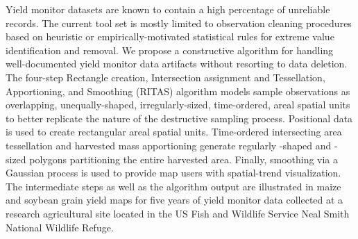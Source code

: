 
Yield monitor datasets are known to contain a high percentage of
unreliable records. The current tool set is mostly limited to
observation cleaning procedures based on heuristic or
empirically-motivated statistical rules for extreme value
identification and removal. We propose a constructive algorithm for
handling well-documented yield monitor data artifacts without
resorting to data deletion. The four-step Rectangle creation,
Intersection assignment and Tessellation, Apportioning, and Smoothing
(RITAS) algorithm models sample observations as overlapping,
unequally-shaped, irregularly-sized, time-ordered, areal spatial units
to better replicate the nature of the destructive sampling
process. Positional data is used to create rectangular areal spatial
units. Time-ordered intersecting area tessellation and harvested mass
apportioning generate regularly -shaped and \mbox{-sized} polygons
partitioning the entire harvested area. Finally, smoothing via a
Gaussian process is used to provide map users with spatial-trend
visualization. The intermediate steps as well as the algorithm output
are illustrated in maize and soybean grain yield maps for five years
of yield monitor data collected at a research agricultural site
located in the US Fish and Wildlife Service Neal Smith National
Wildlife Refuge.

